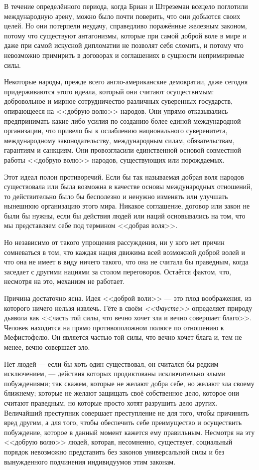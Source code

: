 В течение определённого периода, когда Бриан и Штреземан всецело поглотили международную арену, можно было почти поверить, что они добьются своих целей. Но они потерпели неудачу, справедливо поражённые железным законом, потому что существуют антагонизмы, которые при самой доброй воле в мире и даже при самой искусной дипломатии не позволят себя сломить, и потому что невозможно примирить в договорах и соглашениях в сущности непримиримые силы.

Некоторые народы, прежде всего англо-американские демократии, даже сегодня придерживаются этого идеала, который они считают осуществимым: добровольное и мирное сотрудничество различных суверенных государств, опирающееся на <<добрую волю>> народов. Они упрямо отказывались предпринимать какие-либо усилия по созданию более единой международной организации, что привело бы к ослаблению национального суверенитета, международному законодательству, международным силам, обязательствам, гарантиям и санкциям. Они провозгласили единственной основой совместной работы <<добрую волю>> народов, существующих или порождаемых.

Этот идеал полон противоречий. Если бы так называемая добрая воля народов существовала или была возможна в качестве основы международных отношений, то действительно было бы бесполезно и ненужно изменять или улучшать нынешнюю организацию этого мира. Никакое соглашение, договор или закон не были бы нужны, если бы действия людей или наций основывались на том, что мы представляем себе под термином <<добрая воля>>.

Но независимо от такого упрощения рассуждения, ни у кого нет причин сомневаться в том, что каждая нация движима всей возможной доброй волей и что она не имеет в виду ничего такого, что она не считала бы праведным, когда заседает с другими нациями за столом переговоров. Остаётся фактом, что, несмотря на это, механизм не работает.

Причина достаточно ясна. Идея <<доброй воли>> — это плод воображения, из которого ничего нельзя извлечь. Гёте в своём \textit{<<Фаусте>>} определяет природу дьявола как <<часть той силы, что вечно хочет зла и вечно совершает благо>>. Человек находится на прямо противоположном полюсе по отношению к Мефистофелю. Он является частью той силы, что вечно хочет блага и, тем не менее, вечно совершает зло.

Нет людей — если бы хоть один существовал, он считался бы редким исключением, — действия которых продиктованы исключительно злыми побуждениями; так скажем, которые не желают добра себе, но желают зла своему ближнему; которые не желают защищать своё собственное дело, которое они считают праведным, но которые просто хотят разрушить дело других. Величайший преступник совершает преступление не для того, чтобы причинить вред другим, а для того, чтобы обеспечить себе преимущество и осуществить побуждение, которое в данный момент кажется ему правильным. Несмотря на эту <<добрую волю>> людей, которая, несомненно, существует, социальный порядок невозможно представить без законов универсальной силы и без вынужденного подчинения индивидуумов этим законам.

